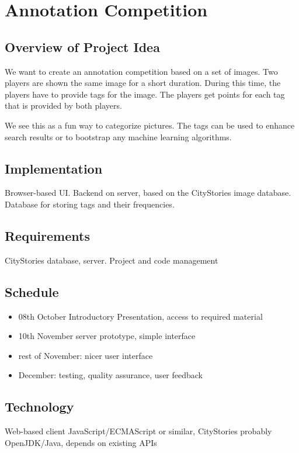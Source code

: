 \documentclass[10pt]{article}%
\begin{document}
\section{Annotation Competition}
\subsection{Overview of Project Idea}

We want to create an annotation competition based on a set of images. Two players are shown the same image for a short duration. During this time, the players have to provide tags for the image. The players get points for each tag that is provided by both players.

We see this as a fun way to categorize pictures. The tags can be used to enhance search results or to bootstrap any machine learning algorithms.

\subsection{Implementation}

Browser-based UI. Backend on server, based on the CityStories image database. Database for storing tags and their frequencies.

\subsection{Requirements}

CityStories database, server. Project and code management

\subsection{Schedule}
\begin{itemize}
\item 08th October Introductory Presentation, access to required material
\item 10th November server prototype, simple interface
\item rest of November: nicer user interface
\item December: testing, quality assurance, user feedback
\end{itemize}


\subsection{Technology}

Web-based client JavaScript/ECMAScript or similar, CityStories probably OpenJDK/Java, depends on existing APIs
\end{document}
